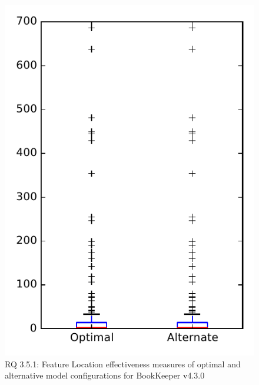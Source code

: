 
\begin{figure}
\centering
\includegraphics[height=0.4\textheight]{figures/combo/flt_rq1_bookkeeper}
\caption{RQ 3.5.1: Feature Location effectiveness measures of optimal and alternative model configurations for BookKeeper v4.3.0}
\label{fig:combo:flt:rq1:bookkeeper}
\end{figure}
